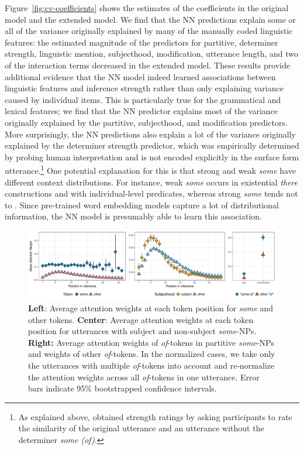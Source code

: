\documentclass[11pt,a4paper]{article}
\newcommand{\figref}[1]{Figure~\ref{#1}}
\begin{document}
\figref{fig:cv-coefficients} shows the estimates of the coefficients in the original model and the extended model. We find that the NN predictions explain some or all of the variance originally explained by many of the manually coded linguistic features: the estimated magnitude of the predictors for partitive, determiner strength, linguistic mention, subjecthood, modification, utterance length,  and two of the interaction terms decreased in the extended model. These results provide additional evidence that the NN model indeed learned associations between linguistic features and inference strength rather than only explaining  variance caused by individual items. This is particularly true for the grammatical and lexical features; we find that the NN predictor explains most of the variance originally explained by the partitive, subjecthood, and modification predictors. More surprisingly, the NN predictions also explain a lot of the variance originally explained by the determiner strength predictor, which was empirically determined by probing human interpretation and is not encoded explicitly in the surface form utterance.\footnote{As explained above,  obtained strength ratings by asking participants to rate the similarity of the original utterance and an utterance without the determiner \textit{some (of)}.} One potential explanation for this is that strong and weak \textit{some} have different context distributions. For instance, weak \emph{some} occurs in existential \emph{there} constructions and with individual-level predicates, whereas strong \emph{some} tends not to \cite{milsark1974,mcnally1998,carlson1977}. Since pre-trained word embedding models capture a lot of distributional information, the NN model is presumably able to learn this association. 

\begin{figure}[t]
	\includegraphics[trim={0 0.5cm 0 0},clip,width=\textwidth]{./images/attn-analysis.pdf}
	\caption{\textbf{Left}: Average attention weights at each token position for \emph{some} and other tokens. \textbf{Center}:  Average attention weights at each token position for utterances with subject and non-subject \emph{some}-NPs. \textbf{Right:}
	Average attention weights of \emph{of}-tokens in partitive \emph{some}-NPs and weights of other \emph{of}-tokens. In the normalized cases, we take only the utterances with multiple \emph{of}-tokens into account and re-normalize the attention weights across all \emph{of}-tokens in one utterance. Error bars indicate 95\% bootstrapped confidence intervals.}
	\label{fig:avgattn}
\end{figure}
\end{document}
